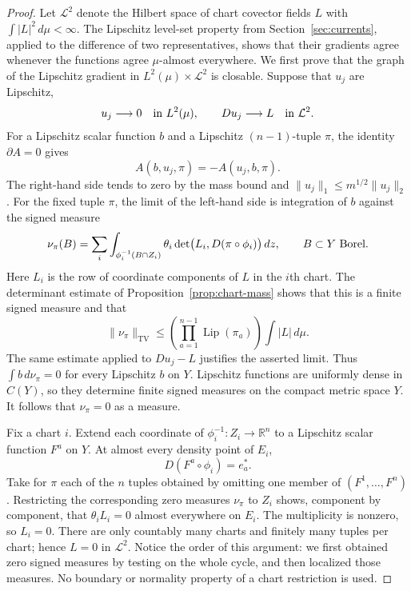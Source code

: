 \documentclass[11pt]{article}
\numberwithin{equation}{section}
\theoremstyle{definition}
\theoremstyle{remark}
\begin{document}
\begin{proof}
Let $\mathcal L^2$ denote the Hilbert space of chart covector fields
$L$ with $\int|L|^2\,d\mu<\infty$. The Lipschitz level-set property
from Section~\ref{sec:currents}, applied to the difference of two
representatives, shows that their gradients agree whenever the functions
agree $\mu$-almost everywhere. We first prove that the graph of
the Lipschitz gradient in $L^2(\mu)\times\mathcal L^2$ is closable.
Suppose that $u_j$ are Lipschitz,
\[
 u_j\longrightarrow0\quad\hbox{in }L^2(\mu),\qquad
 Du_j\longrightarrow L\quad\hbox{in }\mathcal L^2.
\]
For a Lipschitz scalar function $b$ and a Lipschitz
$(n-1)$-tuple $\pi$, the identity $\partial A=0$ gives
\begin{equation}
 A(b,u_j,\pi)=-A(u_j,b,\pi).
 \label{eq:cycle-gradient-identity}
\end{equation}
The right-hand side tends to zero by the mass bound and
$\|u_j\|_1\le m^{1/2}\|u_j\|_2$.  For the fixed tuple $\pi$, the limit
of the left-hand side is integration of $b$ against the signed measure
\[
 \nu_\pi(B)=\sum_i
 \int_{\phi_i^{-1}(B\cap Z_i)}
 \theta_i\det\bigl(L_i,D(\pi\circ\phi_i)\bigr)\,dz,
 \qquad B\subset Y\ \hbox{Borel}.
\]
Here $L_i$ is the row of coordinate components of $L$ in the $i$th
chart.  The determinant estimate of
Proposition~\ref{prop:chart-mass} shows that this is a finite signed
measure and that
\[
 \|\nu_\pi\|_{\mathrm{TV}}
 \le \left(\prod_{a=1}^{n-1}\operatorname{Lip}(\pi_a)\right)
       \int|L|\,d\mu.
\]
The same estimate applied to $Du_j-L$ justifies the asserted limit.
Thus $\int b\,d\nu_\pi=0$ for every Lipschitz $b$ on $Y$.
Lipschitz functions are uniformly dense in $C(Y)$, so they determine
finite signed measures on the compact metric space $Y$.  It follows
that $\nu_\pi=0$ as a measure.

Fix a chart $i$.  Extend each coordinate of $\phi_i^{-1}:Z_i\to\mathbb R^n$
to a Lipschitz scalar function $F^a$ on $Y$.  At almost every density
point of $E_i$,
\[
 D(F^a\circ\phi_i)=e_a^*.
\]
Take for $\pi$ each of the $n$ tuples obtained by omitting one member
of $(F^1,\ldots,F^n)$.  Restricting the corresponding zero measures
$\nu_\pi$ to $Z_i$ shows, component by component, that
$\theta_i L_i=0$ almost everywhere on $E_i$.  The multiplicity is
nonzero, so $L_i=0$.  There are only countably many charts and finitely
many tuples per chart; hence $L=0$ in $\mathcal L^2$.
Notice the order of this argument: we first obtained zero signed
measures by testing on the whole cycle, and then localized those
measures.  No boundary or normality property of a chart restriction
is used.


\end{proof}
\end{document}
